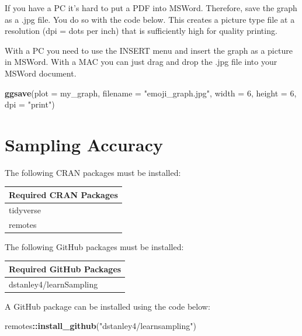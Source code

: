 \documentclass[
]{krantz}
\makeatletter
\newenvironment{Shaded}{\begin{snugshade}}{\end{snugshade}}
\newcommand{\DataTypeTok}[1]{\textcolor[rgb]{0.27,0.27,0.27}{#1}}
\newcommand{\DecValTok}[1]{\textcolor[rgb]{0.06,0.06,0.06}{#1}}
\newcommand{\KeywordTok}[1]{\textcolor[rgb]{0.27,0.27,0.27}{\textbf{#1}}}
\newcommand{\NormalTok}[1]{#1}
\newcommand{\OperatorTok}[1]{\textcolor[rgb]{0.43,0.43,0.43}{\textbf{#1}}}
\newcommand{\StringTok}[1]{\textcolor[rgb]{0.5,0.5,0.5}{#1}}
\newenvironment{kframe}{%
\medskip{}
\setlength{\fboxsep}{.8em}
 \def\at@end@of@kframe{}%
 \ifinner\ifhmode%
  \def\at@end@of@kframe{\end{minipage}}%
  \begin{minipage}{\columnwidth}%
 \fi\fi%
 \def\FrameCommand##1{\hskip\@totalleftmargin \hskip-\fboxsep
 \colorbox{shadecolor}{##1}\hskip-\fboxsep
     \hskip-\linewidth \hskip-\@totalleftmargin \hskip\columnwidth}%
 \MakeFramed {\advance\hsize-\width
   \@totalleftmargin\z@ \linewidth\hsize
   \@setminipage}}%
 {\par\unskip\endMakeFramed%
 \at@end@of@kframe}
\renewenvironment{Shaded}{\begin{kframe}}{\end{kframe}}
\makeatother
\begin{document}
If you have a PC it's hard to put a PDF into MSWord. Therefore, save the graph as a .jpg file. You do so with the code below. This creates a picture type file at a resolution (dpi = dots per inch) that is sufficiently high for quality printing.

With a PC you need to use the INSERT menu and insert the graph as a picture in MSWord. With a MAC you can just drag and drop the .jpg file into your MSWord document.

\begin{Shaded}
\begin{Highlighting}[]
\KeywordTok{ggsave}\NormalTok{(}\DataTypeTok{plot =}\NormalTok{ my_graph, }
       \DataTypeTok{filename =} \StringTok{"emoji_graph.jpg"}\NormalTok{, }
       \DataTypeTok{width =} \DecValTok{6}\NormalTok{, }
       \DataTypeTok{height =} \DecValTok{6}\NormalTok{, }
       \DataTypeTok{dpi =} \StringTok{"print"}\NormalTok{)}
\end{Highlighting}
\end{Shaded}

\hypertarget{sampling-accuracy}{%
\chapter{Sampling Accuracy}\label{sampling-accuracy}}

The following CRAN packages must be installed:

\begin{longtable}[]{@{}l@{}}
\toprule
Required CRAN Packages\tabularnewline
\midrule
\endhead
tidyverse\tabularnewline
remotes\tabularnewline
\bottomrule
\end{longtable}

The following GitHub packages must be installed:

\begin{longtable}[]{@{}l@{}}
\toprule
Required GitHub Packages\tabularnewline
\midrule
\endhead
dstanley4/learnSampling\tabularnewline
\bottomrule
\end{longtable}

A GitHub package can be installed using the code below:

\begin{Shaded}
\begin{Highlighting}[]
\NormalTok{remotes}\OperatorTok{::}\KeywordTok{install_github}\NormalTok{(}\StringTok{"dstanley4/learnsampling"}\NormalTok{)}
\end{Highlighting}
\end{Shaded}
\end{document}
